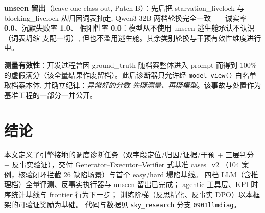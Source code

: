 \documentclass[UTF8,12pt,a4paper]{ctexart}
\begin{document}
\textbf{unseen 留出}（leave-one-class-out, Patch B）：先后把
starvation\_livelock 与 blocking\_livelock 从归因词表抽走, Qwen3-32B
两档轮换完全一致——诚实率 \textbf{0.0}、沉默失败率 \textbf{1.0}、
假阳性率 \textbf{0.0}：模型从不使用 unseen 逃生舱承认不认识（词表坍缩
支配一切）, 但也不滥用逃生舱。其余类别轮换与干预有效性维度进行中。

\textbf{测量有效性}：开发过程曾因 ground\_truth 随档案整体进入 prompt
而得到 100\% 的虚假满分（该全量结果作废留档）。此后诊断器只允许经
\texttt{model\_view()} 白名单取档案本体, 并确立纪律：\emph{异常好的分数
先疑测量、再疑模型}。该事故与处置作为基准工程的一部分一并公开。

\section{结论}

本文定义了引擎接地的调度诊断任务（双字段定位/归因/证据/干预 + 三层判分 +
反事实验证），交付 Generator--Executor--Verifier 式基准 cases\_v2
（104 案例，核验闭环拦截 26 缺陷场景）与首个 easy/hard 塌陷基线。
四档 LLM（含推理档）全量评测、反事实执行器与 unseen 留出已完成；
agentic 工具层、KPI 时序统计基线与 frontier 行为下一步；
训练阶梯（反思精化、反事实 DPO）以本框架的可验证奖励为基础。
代码与数据见 \texttt{sky\_research} 分支 \texttt{0901llmdiag}。
\end{document}
